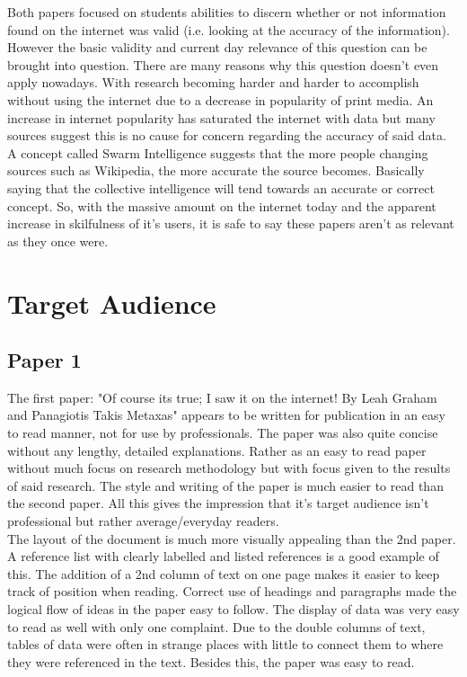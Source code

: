\documentclass[11pt]{article}
\begin{document}
Both papers focused on students abilities to discern whether or not information found on the internet was valid (i.e. looking at the accuracy of the information). However the basic validity and current day relevance of this question can be brought into question. There are many reasons why this question doesn't even apply nowadays. \citep{van2011internet} With research becoming harder and harder to accomplish without using the internet due to a decrease in popularity of print media. An increase in internet popularity has saturated the internet with data but many sources suggest this is no cause for concern regarding the accuracy of said data. A concept called Swarm Intelligence suggests that the more people changing sources such as Wikipedia, the more accurate the source becomes. Basically saying that the collective intelligence will tend towards an accurate or correct concept. \citep{kennedy2001swarm} So, with the massive amount on the internet today and the apparent increase in skilfulness of it's users, it is safe to say these papers aren't as relevant as they once were.
\clearpage

\section{Target Audience}

\subsection{Paper 1}

The first paper: "Of course its true; I saw it on the internet! By Leah Graham and Panagiotis Takis Metaxas" \citep{graham2003course} appears to be written for publication in an easy to read manner, not for use by professionals. The paper was also quite concise without any lengthy, detailed explanations. Rather as an easy to read paper without much focus on research methodology but with focus given to the results of said research. The style and writing of the paper is much easier to read than the second paper. All this gives the impression that it's target audience isn't professional but rather average/everyday readers.
\\

The layout of the document is much more visually appealing than the 2nd paper. A reference list with clearly labelled and listed references is a good example of this. The addition of a 2nd column of text on one page makes it easier to keep track of position when reading. Correct use of headings and paragraphs made the logical flow of ideas in the paper easy to follow. The display of data was very easy to read as well with only one complaint. Due to the double columns of text, tables of data were often  in strange places with little to connect them to where they were referenced in the text. Besides this, the paper was easy to read.
\\
\end{document}
